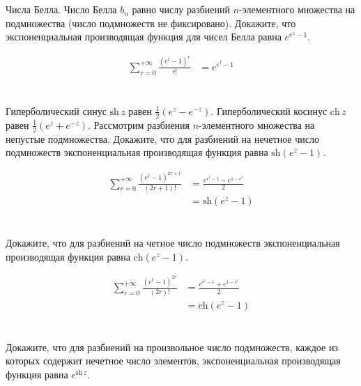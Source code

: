 \section{}
Числа Белла. Число Белла \(b_n\) равно числу разбиений \(n\)-элементного множества на подмножества (число подмножеств не фиксировано). Докажите, что экспоненциальная производящая функция для чисел Белла равна \(e^{e^z-1}\).

\begin{align*}
    \sum_{r = 0}^{+\infty} \frac{(e^t - 1)^r}{r!} & = e^{e^t - 1}
\end{align*}

\section{}
Гиперболический синус \(\mathrm{sh}\,z\) равен \(\frac{1}{2}(e^{z}-e^{-z})\). Гиперболический косинус \(\mathrm{ch}\,z\) равен \(\frac{1}{2}(e^{z}+e^{-z})\). Рассмотрим разбиения \(n\)-элементного множества на непустые подмножества. Докажите, что для разбиений на нечетное число подмножеств экспоненциальная производящая функция равна \(\mathrm{sh}(e^z-1)\).

\begin{align*}
    \sum_{r = 0}^{+\infty} \frac{(e^t - 1)^{2r + 1}}{(2r + 1)!} & = \frac{e^{e^t - 1} - e^{1 - e^t}}{2} \\
                                                                & = \mathrm{sh}(e^z-1)
\end{align*}

\section{}
Докажите, что для разбиений на четное число подмножеств экспоненциальная производящая функция равна \(\mathrm{ch}(e^z-1)\).

\begin{align*}
    \sum_{r = 0}^{+\infty} \frac{(e^t - 1)^{2r}}{(2r)!} & = \frac{e^{e^t - 1} + e^{1 - e^t}}{2} \\
                                                        & = \mathrm{ch}(e^z-1)
\end{align*}

\section{}
Докажите, что для разбиений на произвольное число подмножеств, каждое из которых содержит нечетное число элементов, экспоненциальная производящая функция равна \(e^{\mathrm{sh}\,z}\).


